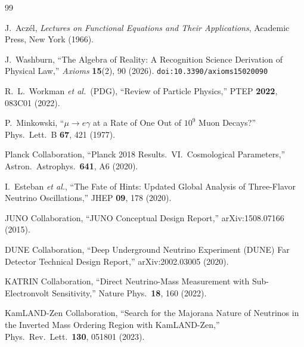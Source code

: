 \documentclass[12pt,a4paper]{article}
\theoremstyle{definition}
\theoremstyle{remark}
\begin{document}
\begin{thebibliography}{99}

J.~Acz\'el, \textit{Lectures on Functional Equations and Their
Applications}, Academic Press, New York (1966).

J.~Washburn, ``The Algebra of Reality: A Recognition Science Derivation
of Physical Law,'' \emph{Axioms} \textbf{15}(2), 90 (2026).
\texttt{doi:10.3390/axioms15020090}

R.~L.~Workman \textit{et al.}\ (PDG), ``Review of Particle
Physics,'' PTEP \textbf{2022}, 083C01 (2022).

P.~Minkowski, ``$\mu \to e\gamma$ at a Rate of One Out of
$10^9$ Muon Decays?'' Phys.\ Lett.\ B \textbf{67}, 421
(1977).

Planck Collaboration, ``Planck 2018 Results.\ VI.\
Cosmological Parameters,'' Astron.\ Astrophys.\
\textbf{641}, A6 (2020).

I.~Esteban \textit{et al.}, ``The Fate of Hints: Updated
Global Analysis of Three-Flavor Neutrino Oscillations,''
JHEP \textbf{09}, 178 (2020).

JUNO Collaboration, ``JUNO Conceptual Design Report,''
arXiv:1508.07166 (2015).

DUNE Collaboration, ``Deep Underground Neutrino Experiment
(DUNE) Far Detector Technical Design Report,''
arXiv:2002.03005 (2020).

KATRIN Collaboration, ``Direct Neutrino-Mass Measurement
with Sub-Electronvolt Sensitivity,'' Nature Phys.\
\textbf{18}, 160 (2022).

\bibitem{KamLAND}
KamLAND-Zen Collaboration, ``Search for the Majorana Nature
of Neutrinos in the Inverted Mass Ordering Region with
KamLAND-Zen,'' Phys.\ Rev.\ Lett.\ \textbf{130}, 051801
(2023).

\end{thebibliography}
\end{document}
